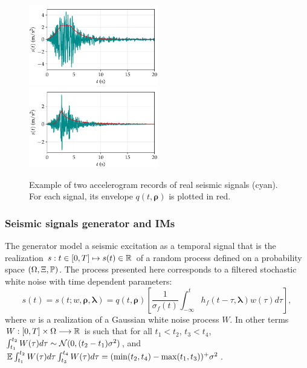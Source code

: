 \begin{figure}[h]
    \centering
    \includegraphics[width=5.625cm]{figures/intro-frags/seism1.pdf}\hspace*{0.5cm}
    \includegraphics[width=5.625cm]{figures/intro-frags/seism2.pdf}
    \caption{Example of two accelerogram records of real seismic signals (cyan). For each signal, its envelope $q(t,\boldsymbol{\rho})$ is plotted in red.} %
    \label{fig:intro-frags:real-seism}
\end{figure}





\subsubsection{Seismic signals generator and IMs}


The generator model a seismic excitation as a temporal signal that is the realization
$s:t\in[0,T]\mapsto s(t)\in\mathbb{R}$ of a random process defined on a probability space $(\Omega,\Xi,\mathbb{P})$. 
The process presented here corresponds to a filtered stochastic white noise with time dependent parameters:
    \begin{equation}\label{eq:intro-frags:sgenertor}
        s(t)= s(t;w,\boldsymbol{\rho},\boldsymbol{\lambda}) = q(t,\boldsymbol\rho)\left[\frac{1}{\sigma_f(t)}\int_{-\infty}^t h_f(t-\tau,\boldsymbol\lambda)w(\tau)d\tau \right],
    \end{equation}
where $w$ is a realization of a Gaussian white noise process $W$. In other terms $W:[0,T]\times\Omega\longrightarrow\mathbb{R}$ is such that for all $t_1<t_2$, $t_3<t_4$, 
$\int_{t_1}^{t_2}W(\tau)d\tau\sim\mathcal{N}(0,(t_2-t_1)\sigma^2)$, and $\mathbb{E}\int_{t_1}^{t_2}W(\tau)d\tau\int_{t_3}^{t_4}W(\tau)d\tau=(\min(t_2,t_4)-\max(t_1,t_3))^+\sigma^2$.


